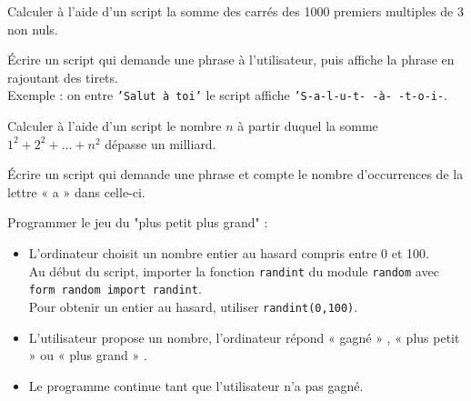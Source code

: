 \begin{exercice}
    Calculer à l'aide d'un script la somme des carrés des 1000 premiers multiples de 3 non nuls.
\end{exercice}

\begin{exercice}
    \'Ecrire un script qui demande une phrase à l'utilisateur, puis affiche la phrase en rajoutant des tirets.\\
    Exemple : on entre \texttt{'Salut à toi'} le script affiche \texttt{'S-a-l-u-t- -à- -t-o-i-}.
\end{exercice}

\begin{exercice}
    Calculer à l'aide d'un script le nombre $n$ à partir duquel la somme $1^2+2^2+\ldots+n^2$ dépasse un milliard.
\end{exercice}

\begin{exercice}
    \'Ecrire un script qui demande une phrase et compte le nombre d'occurrences de la lettre  «  a  »  dans celle-ci.
\end{exercice}

\begin{exercice}
    Programmer le jeu du "plus petit plus grand" :
    \begin{itemize}
        \item   L'ordinateur choisit un nombre entier au hasard compris entre 0 et 100.\\
        Au début du script, importer la fonction \texttt{randint} du module \texttt{random} avec \texttt{form random import randint}.\\
        Pour obtenir un entier au hasard, utiliser \texttt{randint(0,100)}.
        \item   L'utilisateur propose un nombre, l'ordinateur répond  «  gagné » ,  «  plus petit »  ou  «  plus grand » .
        \item   Le programme continue tant que l'utilisateur n'a pas gagné.
    \end{itemize}
\end{exercice}

